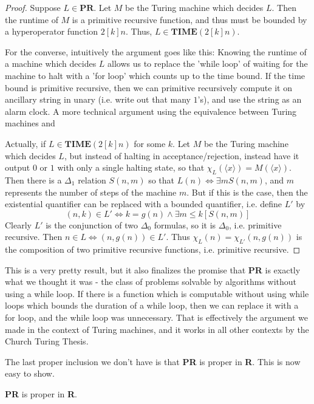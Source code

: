 \begin{proof}
	Suppose $L \in \textbf{PR}$. Let $M$ be the Turing machine which decides $L$. Then the runtime of $M$ is a primitive recursive function, and thus must be bounded by a hyperoperator function $2[k]n$. Thus, $L \in \textbf{TIME}(2[k]n)$. 
	\par For the converse, intuitively the argument goes like this: Knowing the runtime of a machine which decides $L$ allows us to replace the 'while loop' of waiting for the machine to halt with a 'for loop' which counts up to the time bound. If the time bound is primitive recursive, then we can primitive recursively compute it on ancillary string in unary (i.e. write out that many $1$'s), and use the string as an alarm clock. A more technical argument using the equivalence between Turing machines and
	\par Actually, if $L \in \textbf{TIME}(2[k]n)$ for some $k$. Let $M$ be the Turing machine which decides $L$, but instead of halting in acceptance/rejection, instead have it output $0$ or $1$ with only a single halting state, so that $\chi_L(\langle x \rangle) = M(\langle x \rangle)$. Then there is a $\Delta_1$ relation $S(n,m)$ so that $L(n) \iff \exists m S(n,m)$, and $m$ represents the number of steps of the machine $m$. But if this is the case, then the existential quantifier can be replaced with a bounded quantifier, i.e. define $L'$ by
	 \[ (n,k) \in L' \iff k = g(n) \wedge \exists m \leq k [S(n,m)] \]
Clearly $L'$ is the conjunction of two $\Delta_0$ formulas, so it is $\Delta_0$, i.e. primitive recursive. Then $n \in L \iff (n,g(n)) \in L'$. Thus $ \chi_L(n) = \chi_{L'}(n,g(n))$ is the composition of two primitive recursive functions, i.e. primitive recursive. 
\end{proof}
This is a very pretty result, but it also finalizes the promise that \textbf{PR} is exactly what we thought it was - the class of problems solvable by algorithms without using a while loop. If there is a function which is computable without using while loops which bounds the duration of a while loop, then we can replace it with a for loop, and the while loop was unnecessary. That is effectively the argument we made in the context of Turing machines, and it works in all other contexts by the Church Turing Thesis.
\par The last proper inclusion we don't have is that \textbf{PR} is proper in \textbf{R}. This is now easy to show.
\begin{corollary}
	\textbf{PR} is proper in \textbf{R}.
\end{corollary}
